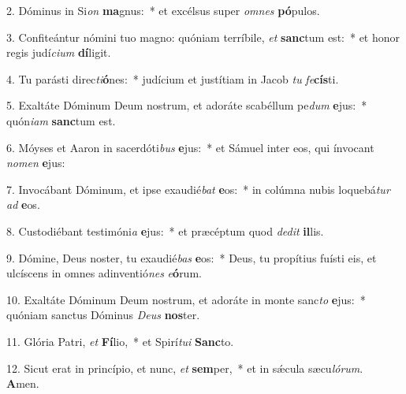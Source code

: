 2. Dóminus in Si\textit{on} \textbf{ma}gnus:~*  et excélsus super \textit{om}\textit{nes} \textbf{pó}pulos.\

3. Confiteántur nómini tuo magno: quóniam terríbile, \textit{et} \textbf{sanc}tum est:~*  et honor regis judí\textit{ci}\textit{um} \textbf{dí}ligit.\

4. Tu parásti direc\textit{ti}\textbf{ó}nes:~*  judícium et justítiam in Jacob \textit{tu} \textit{fe}\textbf{cís}ti.\

5. Exaltáte Dóminum Deum nostrum, et adoráte scabéllum pe\textit{dum} \textbf{e}jus:~*  quón\textit{i}\textit{am} \textbf{sanc}tum est.\

6. Móyses et Aaron in sacerdóti\textit{bus} \textbf{e}jus:~*  et Sámuel inter eos, qui ínvocant \textit{no}\textit{men} \textbf{e}jus:\

7. Invocábant Dóminum, et ipse exaudié\textit{bat} \textbf{e}os:~*  in colúmna nubis loquebá\textit{tur} \textit{ad} \textbf{e}os.\

8. Custodiébant testimóni\textit{a} \textbf{e}jus:~*  et præcéptum quod \textit{de}\textit{dit} \textbf{il}lis.\

9. Dómine, Deus noster, tu exaudié\textit{bas} \textbf{e}os:~*  Deus, tu propítius fuísti eis, et ulcíscens in omnes adinventió\textit{nes} \textit{e}\textbf{ó}rum.\

10. Exaltáte Dóminum Deum nostrum, et adoráte in monte sanc\textit{to} \textbf{e}jus:~*  quóniam sanctus Dóminus \textit{De}\textit{us} \textbf{nos}ter.\

11. Glória Patri, \textit{et} \textbf{Fí}lio,~*  et Spirí\textit{tu}\textit{i} \textbf{Sanc}to.\

12. Sicut erat in princípio, et nunc, \textit{et} \textbf{sem}per,~*  et in sǽcula sæcu\textit{ló}\textit{rum}. \textbf{A}men.\

